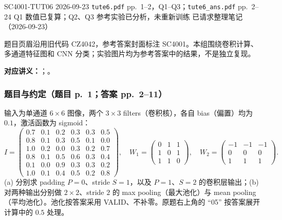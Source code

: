 
\label{tutorial:SC4001-TUT06}
\tutorialmeta
  {SC4001-TUT06}
  {2026-09-23}
  {\texttt{tute6.pdf} pp.~1--2，Q1--Q3；\texttt{tute6\_ans.pdf} pp.~2--24}
  {Q1 数值已复算；Q2、Q3 参考实验已分析，未重新训练}
  {已请求整理笔记（2026-09-23）}

题目页眉沿用旧代码 CZ4042，参考答案封面标注 SC4001。本组围绕卷积计算、多通道特征图和 CNN 分类；实验图片均为参考答案中的结果，不是独立复现。

\textbf{对应讲义：}；。

\subsubsection*{题目与约定（题目 p.~1；答案 pp.~2--11）}
输入为单通道 $6\times6$ 图像，两个 $3\times3$ filters（卷积核），各自 bias（偏置）均为 $0.1$，激活函数为 sigmoid：
\[
I=\begin{pmatrix}
0.7&0.1&0.2&0.3&0.3&0.5\\
0.8&0.1&0.3&0.5&0.1&0.0\\
1.0&0.2&0.0&0.3&0.2&0.7\\
0.8&0.1&0.5&0.6&0.3&0.4\\
0.1&0.0&0.9&0.3&0.3&0.2\\
1.0&0.1&0.4&0.5&0.2&0.8
\end{pmatrix},\quad
W_1=\begin{pmatrix}0&1&1\\1&0&1\\1&1&0\end{pmatrix},\quad
W_2=\begin{pmatrix}-1&-1&-1\\0&0&0\\1&1&1\end{pmatrix}.
\]
(a) 分别求 padding $P=0$、stride $S=1$，以及 $P=1$、$S=2$ 的卷积层输出；(b) 对两种输出分别做 $2\times2$、stride $2$ 的 max pooling（最大池化）与 mean pooling（平均池化）。池化按答案采用 VALID、不补零。原题右上角的 ``05'' 按答案展开计算中的 $0.5$ 处理。

